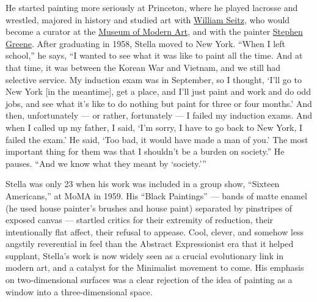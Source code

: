 He started painting more seriously at Princeton, where he played
lacrosse and wrestled, majored in history and studied art with
\href{https://www.nytimes3xbfgragh.onion/1974/10/28/archives/william-c-seitz-art-scholar-dies-excurator-at-the-modern-taught-at.html}{William
Seitz}, who would become a curator at the
\href{https://www.nytimes3xbfgragh.onion/topic/organization/museum-of-modern-art}{Museum
of Modern Art}, and with the painter
\href{https://www.nytimes3xbfgragh.onion/1999/11/29/arts/stephen-greene-82-painter-with-distinctive-abstract-style.html}{Stephen
Greene}. After graduating in 1958, Stella moved to New York. ``When I
left school,'' he says, ``I wanted to see what it was like to paint all
the time. And at that time, it was between the Korean War and Vietnam,
and we still had selective service. My induction exam was in September,
so I thought, `I'll go to New York {[}in the meantime{]}, get a place,
and I'll just paint and work and do odd jobs, and see what it's like to
do nothing but paint for three or four months.' And then, unfortunately
--- or rather, fortunately --- I failed my induction exams. And when I
called up my father, I said, `I'm sorry, I have to go back to New York,
I failed the exam.' He said, `Too bad, it would have made a man of you.'
The most important thing for them was that I shouldn't be a burden on
society.'' He pauses. ``And we know what they meant by `society.'''

Stella was only 23 when his work was included in a group show, ``Sixteen
Americans,'' at MoMA in 1959. His ``Black Paintings'' --- bands of matte
enamel (he used house painter's brushes and house paint) separated by
pinstripes of exposed canvas --- startled critics for their extremity of
reduction, their intentionally flat affect, their refusal to appease.
Cool, clever, and somehow less angstily reverential in feel than the
Abstract Expressionist era that it helped supplant, Stella's work is now
widely seen as a crucial evolutionary link in modern art, and a catalyst
for the Minimalist movement to come. His emphasis on two-dimensional
surfaces was a clear rejection of the idea of painting as a window into
a three-dimensional space.

